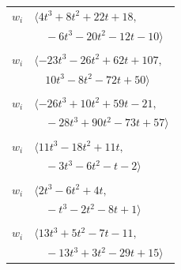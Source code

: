\documentclass[11pt]{article}
\begin{document}
\begin{longtable}{@{}ll@{}}
$w_i$ & $\langle 4t^{3}+8t^{2}+22t+18,$\\
 & $\quad -6t^{3}-20t^{2}-12t-10\rangle$\\
\addlinespace[2pt]
\multicolumn{2}{@{}p{0.97\textwidth}@{}}{$i=14$, $D_i=37$, $\varphi_i=\tau(\Pi_{15})$, $\rho_{ij}$: $1{:}3, \allowbreak 4{:}3, \allowbreak 5{:}2, \allowbreak 12{:}2, \allowbreak 22{:}1, \allowbreak 23{:}1, \allowbreak 33{:}1, \allowbreak 34{:}2, \allowbreak 36{:}3, \allowbreak 44{:}2$}\\
$w_i$ & $\langle -23t^{3}-26t^{2}+62t+107,$\\
 & $\quad 10t^{3}-8t^{2}-72t+50\rangle$\\
\addlinespace[2pt]
\multicolumn{2}{@{}p{0.97\textwidth}@{}}{$i=16$, $D_i=1$, $\varphi_i=1$, $\rho_{ij}$: $4{:}2, \allowbreak 5{:}3, \allowbreak 6{:}1, \allowbreak 8{:}2, \allowbreak 12{:}3, \allowbreak 13{:}2, \allowbreak 22{:}3, \allowbreak 24{:}2, \allowbreak 27{:}1, \allowbreak 38{:}3, \allowbreak 43{:}3, \allowbreak 44{:}1, \allowbreak 46{:}2$}\\
$w_i$ & $\langle -26t^{3}+10t^{2}+59t-21,$\\
 & $\quad -28t^{3}+90t^{2}-73t+57\rangle$\\
\addlinespace[2pt]
\multicolumn{2}{@{}p{0.97\textwidth}@{}}{$i=17$, $D_i=1$, $\varphi_i=1$, $\rho_{ij}$: $5{:}1, \allowbreak 7{:}2, \allowbreak 15{:}1, \allowbreak 23{:}1, \allowbreak 32{:}3, \allowbreak 40{:}2, \allowbreak 43{:}3, \allowbreak 46{:}1$}\\
$w_i$ & $\langle 11t^{3}-18t^{2}+11t,$\\
 & $\quad -3t^{3}-6t^{2}-t-2\rangle$\\
\addlinespace[2pt]
\multicolumn{2}{@{}p{0.97\textwidth}@{}}{$i=18$, $D_i=1$, $\varphi_i=1$, $\rho_{ij}$: $23{:}3, \allowbreak 25{:}1, \allowbreak 31{:}3, \allowbreak 38{:}3, \allowbreak 40{:}1, \allowbreak 45{:}1$}\\
$w_i$ & $\langle 2t^{3}-6t^{2}+4t,$\\
 & $\quad -t^{3}-2t^{2}-8t+1\rangle$\\
\addlinespace[2pt]
\multicolumn{2}{@{}p{0.97\textwidth}@{}}{$i=19$, $D_i=1$, $\varphi_i=1$, $\rho_{ij}$: $3{:}2, \allowbreak 9{:}1, \allowbreak 10{:}1, \allowbreak 20{:}1, \allowbreak 25{:}1, \allowbreak 26{:}3, \allowbreak 27{:}2, \allowbreak 30{:}1, \allowbreak 31{:}2, \allowbreak 38{:}3, \allowbreak 39{:}2, \allowbreak 41{:}1, \allowbreak 45{:}3$}\\
$w_i$ & $\langle 13t^{3}+5t^{2}-7t-11,$\\
 & $\quad -13t^{3}+3t^{2}-29t+15\rangle$\\

\end{longtable}
\end{document}
